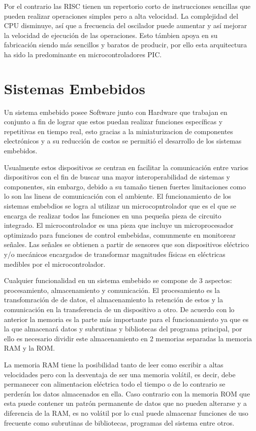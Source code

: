 \documentclass[letterpaper,12pt,oneside]{book}
\begin{document}
			Por el contrario las RISC tienen un repertorio corto de instrucciones sencillas que pueden realizar operaciones simples pero a alta velocidad. La complejidad del CPU disminuye, así que a frecuencia del oscilador puede aumentar y así mejorar la velocidad de ejecución de las operaciones. Esto támbien apoya en su fabricación siendo más sencillos y baratos de producir, por ello esta arquitectura ha sido la predominante en microcontroladores PIC.
		\section{Sistemas Embebidos}
		Un sistema embebido posee Software junto con Hardware que trabajan en conjunto a fin de lograr que estos puedan realizar funciones específicas y repetitivas en tiempo real, esto gracias a la miniaturizacion de componentes electrónicos y a su reducción de costos se permitió el desarrollo de los sistemas embebidos.
		
		Usualmente estos dispositivos se centran en facilitar la comunicación entre varios dispositivos con el fin de buscar una mayor interoperabilidad de sistemas y componentes, sin embargo, debido a su tamaño tienen fuertes limitaciones como lo son las lineas de comunicación con el ambiente. El funcionamiento de los sistemas embebdios se logra al utilizar un microcopntrolador que es el que se encarga de realizar todos las funciones en una pequeña pieza de circuito integrado. El microcontrolador es una pieza que incluye un microprocesador optimizado para funciones de control embebidas, comunmente en monitorear señales. Las señales se obtienen a partir de sensores que son dispositivos eléctrico y/o mecánicos encargados de transformar magnitudes físicas en eléctricas medibles por el microcontrolador.

		Cualquier funcionalidad en un sistema embebido se compone de 3 aspectos: procesamiento, almacenamiento y comunicación. El procesamiento es la transfomración de de datos, el almacenamiento la retención de estos y la comunicación en la transferencia de un dispositivo a otro. De acuerdo con lo anterior la memoria es la parte más importante para el funcionamiento ya que es la que almacenará datos y subrutinas y bibliotecas del programa principal, por ello es necesario dividir este almacenamiento en 2 memorias separadas la memoria RAM y la ROM.

		La memoria RAM tiene la posibilidad tanto de leer como escribir a altas velocidades pero con la desventaja de ser una memoria volátil, es decir, debe permanecer con alimentacion eléctrica todo el tiempo o de lo contrario se perderán los datos almacenados en ella. Caso contrario con la memoria ROM que esta puede contener un patrón permanente de datos que no pueden alterarse y a diferencia de la RAM, es no volátil por lo cual puede almacenar funciones de uso frecuente como subrutinas de bibliotecas, programas del sistema entre otros.
\end{document}
